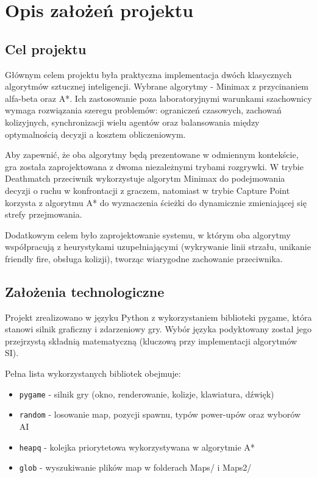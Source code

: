 \chapter{Opis założeń projektu}
\label{cha:Opis założeń projektu}

\section{Cel projektu}

Głównym celem projektu była praktyczna implementacja dwóch klasycznych algorytmów sztucznej inteligencji. 
Wybrane algorytmy - Minimax z przycinaniem alfa-beta oraz A*. Ich zastosowanie poza laboratoryjnymi warunkami 
szachownicy wymaga rozwiązania szeregu problemów: ograniczeń czasowych, zachowań kolizyjnych, synchronizacji 
wielu agentów oraz balansowania między optymalnością decyzji a kosztem obliczeniowym.
 
Aby zapewnić, że oba algorytmy będą prezentowane w odmiennym kontekście, gra została zaprojektowana z dwoma niezależnymi 
trybami rozgrywki. W trybie Deathmatch przeciwnik wykorzystuje algorytm Minimax do podejmowania decyzji o ruchu w konfrontacji 
z graczem, natomiast w trybie Capture Point korzysta z algorytmu A* do wyznaczenia ścieżki do 
dynamicznie zmieniającej się strefy przejmowania.
 
Dodatkowym celem było zaprojektowanie systemu, w którym oba algorytmy współpracują z heurystykami uzupełniającymi 
(wykrywanie linii strzału, unikanie friendly fire, obsługa kolizji), tworząc wiarygodne zachowanie przeciwnika.

\section{Założenia technologiczne}

Projekt zrealizowano w języku Python z wykorzystaniem biblioteki pygame, która stanowi silnik graficzny i zdarzeniowy gry. 
Wybór języka podyktowany został jego przejrzystą składnią matematyczną (kluczową przy implementacji algorytmów SI).
 
Pełna lista wykorzystanych bibliotek obejmuje:

\begin{itemize}
    \item \texttt{pygame} - silnik gry (okno, renderowanie, kolizje, klawiatura, dźwięk)
    \item \texttt{random} - losowanie map, pozycji spawnu, typów power-upów oraz wyborów AI
    \item \texttt{heapq} - kolejka priorytetowa wykorzystywana w algorytmie A*
    \item \texttt{glob} - wyszukiwanie plików map w folderach Maps/ i Maps2/
\end{itemize}
 
